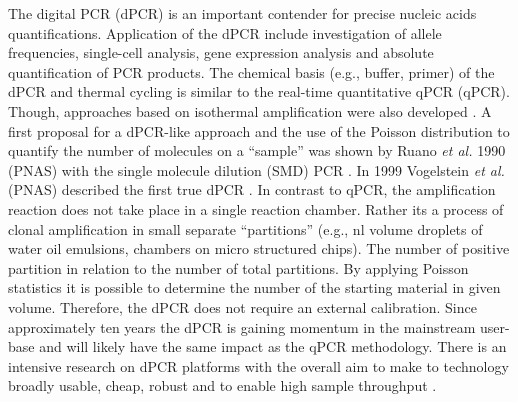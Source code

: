 \documentclass[a4,center,fleqn]{NAR}
\begin{document}
The digital PCR (dPCR) is an important contender for precise nucleic acids 
quantifications. Application of the dPCR include investigation of allele 
frequencies, single-cell analysis, gene expression analysis and absolute quantification of PCR 
products. The chemical basis (e.g., buffer, primer) of the dPCR and thermal 
cycling is similar to the real-time quantitative qPCR (qPCR). Though, approaches 
based on isothermal amplification were also developed 
\cite{pabinger_survey_2014, ludlow_2014, rodiger_r_2015}. A first proposal for a 
dPCR-like approach and the use of the Poisson distribution to quantify the 
number of molecules on a ``sample'' was shown by Ruano \textit{et al.} 1990 
(PNAS) with the single molecule dilution (SMD) PCR \cite{ruano_haplotype_1990}. 
In 1999 Vogelstein \textit{et al.} (PNAS) described the first true dPCR 
\cite{vogelstein_digital_1999}. In contrast to qPCR, the amplification reaction 
does not take place in a single reaction chamber. Rather its a process of clonal 
amplification in small separate ``partitions'' (e.g., nl volume droplets of 
water oil emulsions, chambers on micro structured chips). The number of positive 
partition in relation to the number of total partitions. By applying Poisson 
statistics it is possible to determine the number of the starting material in 
given volume. Therefore, the dPCR does not require an external calibration. Since approximately ten years the 
dPCR is gaining momentum in the mainstream user-base and will likely have the 
same impact as the qPCR methodology. There is an intensive research on dPCR 
platforms with the overall aim to make to technology broadly usable, cheap, 
robust and to enable high sample throughput \cite{selck_increased_2013, huggett_qpcr_2015, 
morley_digital_2014, rodiger_r_2015}.

\enlargethispage{-65.1pt}
  
\end{document}
